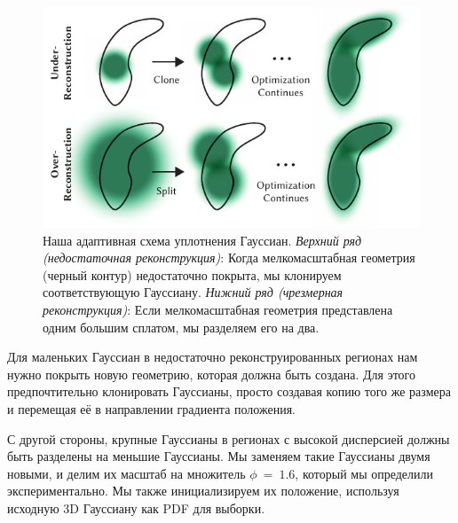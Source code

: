 \begin{figure}[!h]
    \includegraphics[width=\linewidth]{figures/density_control/density_control_01.pdf}
    \caption{
        \label{fig:density_control}
        Наша адаптивная схема уплотнения Гауссиан.
        \emph{Верхний ряд (недостаточная реконструкция)}: Когда мелкомасштабная геометрия (черный контур) недостаточно покрыта, мы клонируем соответствующую Гауссиану.
        \emph{Нижний ряд (чрезмерная реконструкция)}: Если мелкомасштабная геометрия представлена одним большим сплатом, мы разделяем его на два.
    }
\end{figure}

Для маленьких Гауссиан в недостаточно реконструированных регионах нам нужно покрыть новую геометрию, которая должна быть создана.
Для этого предпочтительно клонировать Гауссианы, просто создавая копию того же размера и перемещая её в направлении градиента положения.

С другой стороны, крупные Гауссианы в регионах с высокой дисперсией должны быть разделены на меньшие Гауссианы. Мы заменяем такие Гауссианы двумя новыми, и делим их масштаб на множитель $\phi~=~1.6$, который мы определили экспериментально.
Мы также инициализируем их положение, используя исходную 3D Гауссиану как PDF для выборки.

